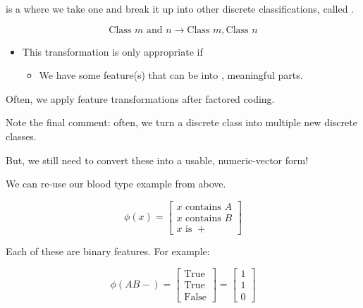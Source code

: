                 \begin{definition}
                     is a  where we take one  and break it up into other discrete classifications, called .

                    \begin{equation}
                        \text{Class } m \text{ and } n \longrightarrow \text{Class } m, \text{Class } n
                    \end{equation}

                    \begin{itemize}
                        \item This transformation is only appropriate if
                            \begin{itemize}
                                \item We have some feature(s) that can be  into , meaningful parts.
                            \end{itemize}
                    \end{itemize}

                    Often, we apply  feature transformations after factored coding. 
                \end{definition}

                Note the final comment: often, we turn a discrete class into multiple new discrete classes. 

                But, we still need to convert these into a usable, numeric-vector form!

                \miniex We can re-use our blood type example from above.

                \begin{equation}
                    \phi(x) = 
                    \begin{bmatrix}
                        x \text{ contains } A \\
                        x \text{ contains } B \\
                        x \text{ is } +
                    \end{bmatrix}
                \end{equation}

                Each of these are binary features. For example:

                \begin{equation}
                    \phi(AB-) =
                    \begin{bmatrix}
                        \text{True} \\
                        \text{True} \\
                        \text{False}
                    \end{bmatrix}
                    =
                    \begin{bmatrix}
                        1 \\ 1 \\ 0
                    \end{bmatrix}
                \end{equation}

